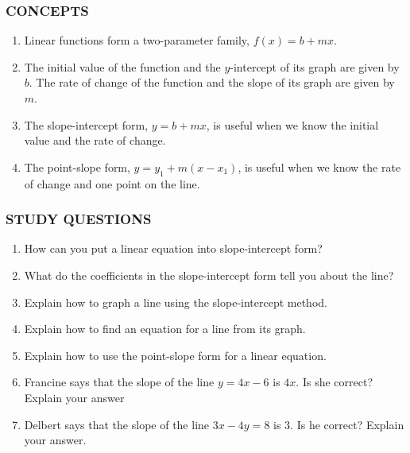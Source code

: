 \documentclass[10pt,]{book}
\theoremstyle{plain}
\theoremstyle{definition}
\theoremstyle{definition}
\theoremstyle{definition}
\theoremstyle{definition}
\numberwithin{equation}{part}
\begin{document}
\subsubsection[{CONCEPTS}]{CONCEPTS}\label{subsubsection-18}
\leavevmode%
\begin{enumerate}[label=\arabic*]
\item\hypertarget{li-1130}{}Linear functions form a two-parameter family, \(f (x) = b + mx\).%
\item\hypertarget{li-1131}{}The initial value of the function and the \(y\)-intercept of its graph are given by \(b\). The rate of change of the function and the slope of its graph are given by \(m\).%
\item\hypertarget{li-1132}{}The slope-intercept form, \(y = b + mx\), is useful when we know the initial value and the rate of change.%
\item\hypertarget{li-1133}{}The point-slope form, \(y = y_1 + m(x - x_1)\), is useful when we know the rate of change and one point on the line.%
\end{enumerate}
%
\typeout{************************************************}
\typeout{************************************************}
\subsubsection[{STUDY QUESTIONS}]{STUDY QUESTIONS}\label{subsubsection-19}
\leavevmode%
\begin{enumerate}[label=\arabic*]
\item\hypertarget{li-1134}{}How can you put a linear equation into slope-intercept form?%
\item\hypertarget{li-1135}{}What do the coefficients in the slope-intercept form tell you about the line?%
\item\hypertarget{li-1136}{}Explain how to graph a line using the slope-intercept method.%
\item\hypertarget{li-1137}{}Explain how to find an equation for a line from its graph.%
\item\hypertarget{li-1138}{}Explain how to use the point-slope form for a linear equation.%
\item\hypertarget{li-1139}{}Francine says that the slope of the line \(y = 4x - 6\) is \(4x\). Is she correct? Explain your answer%
\item\hypertarget{li-1140}{}Delbert says that the slope of the line \(3x - 4y = 8\) is \(3\). Is he correct? Explain your answer.%
\end{enumerate}
%
\typeout{************************************************}
\typeout{************************************************}
\end{document}
